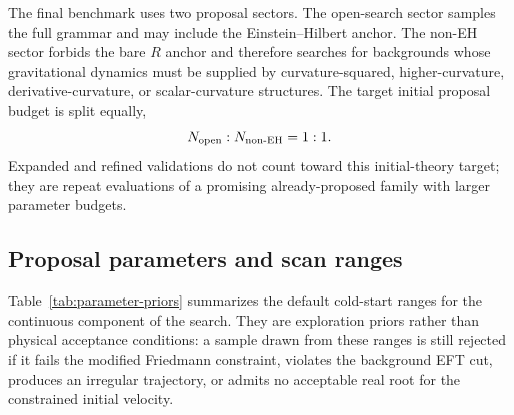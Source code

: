 \documentclass[aps,prd,twocolumn,superscriptaddress,nofootinbib,longbibliography]{revtex4-2}
\begin{document}
The final benchmark uses two proposal sectors.  The open-search sector samples the full grammar and may include the Einstein--Hilbert anchor.  The non-EH sector forbids the bare $R$ anchor and therefore searches for backgrounds whose gravitational dynamics must be supplied by curvature-squared, higher-curvature, derivative-curvature, or scalar-curvature structures.  The target initial proposal budget is split equally,
\begin{equation}
N_{\rm open}:N_{\rm non\text{-}EH}=1:1 .
\label{eq:final-sector-budget}
\end{equation}
Expanded and refined validations do not count toward this initial-theory target; they are repeat evaluations of a promising already-proposed family with larger parameter budgets.

\subsection{Proposal parameters and scan ranges}
\label{subsec:parameter-priors}

Table~\ref{tab:parameter-priors} summarizes the default cold-start ranges for the continuous component of the search.  They are exploration priors rather than physical acceptance conditions: a sample drawn from these ranges is still rejected if it fails the modified Friedmann constraint, violates the background EFT cut, produces an irregular trajectory, or admits no acceptable real root for the constrained initial velocity.
\end{document}
